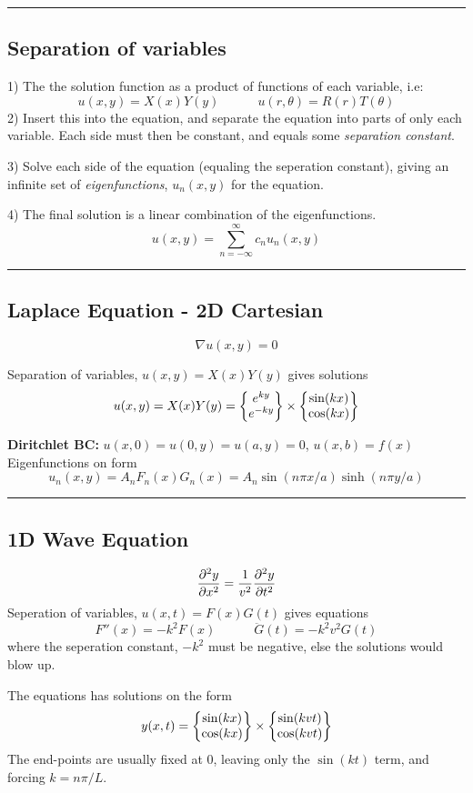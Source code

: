 \documentclass[10pt,a4paper]{article}
\renewcommand{\exp}{e^}
\newcommand{\holine}[1][\medskipamount]{\par\vspace*{\dimexpr-\parskip-\baselineskip+#1}\noindent\rule{\linewidth}{1pt}\par\vspace*{\dimexpr-\parskip-.5\baselineskip+#1}}
\begin{document}
\begin{multicols}{2}
\holine
\subsection*{Separation of variables}
1) The the solution function as a product of functions of each variable, i.e:
\[
    u(x,y) = X(x)Y(y) \quad\quad\quad u(r, \theta) = R(r)T(\theta)
\]
2) Insert this into the equation, and separate the equation into parts of only each variable. Each side must then be constant, and equals some \textit{separation constant}.

3) Solve each side of the equation (equaling the seperation constant), giving an infinite set of \textit{eigenfunctions}, $u_n(x,y)$ for the equation.

4) The final solution is a linear combination of the eigenfunctions.
\[
u(x,y) = \sum_{n=-\infty}^\infty c_n u_n(x,y)
\]



\holine
\subsection*{Laplace Equation - 2D Cartesian}
\[
    \nabla u(x,y) = 0
\]

Separation of variables, $u(x,y) = X(x)Y(y)$ gives solutions
\[
    u(x,y) = X(x)Y(y) = \qty{\begin{matrix} \exp{ky} \\ \exp{-ky} \end{matrix}} \times \qty{\begin{matrix} \sin(kx) \\ \cos(kx) \end{matrix}}
\]

\textbf{Diritchlet BC:} $u(x,0) = u(0,y) = u(a,y) = 0$, $u(x,b) = f(x)$
Eigenfunctions on form
\[
    u_n(x,y) = A_nF_n(x)G_n(x) = A_n\sin(n\pi x/a)\sinh(n\pi y/a)
\]


\holine
\subsection*{1D Wave Equation}
\[
    \pdv[2]{y}{x} = \frac{1}{v^2}\pdv[2]{y}{t}
\]
Seperation of variables, $u(x,t) = F(x)G(t)$ gives equations
\[
    F''(x) = -k^2F(x) \quad\quad\quad \ddot{G}(t) = -k^2v^2G(t)
\]
where the seperation constant, $-k^2$ must be negative, else the solutions would blow up.

The equations has solutions on the form
\[
    y(x,t) = \qty{\begin{matrix} \sin(kx) \\ \cos(kx) \end{matrix}} \times \qty{\begin{matrix} \sin(kvt) \\ \cos(kvt) \end{matrix}}
\]
The end-points are usually fixed at 0, leaving only the $\sin(kt)$ term, and forcing $k=n\pi/L$.


\end{multicols}
\end{document}
